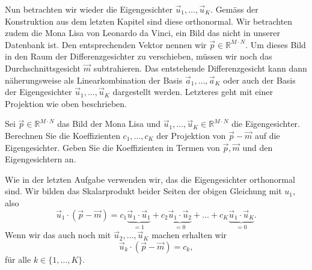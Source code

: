 Nun betrachten wir wieder die Eigengesichter $\vec u_1,\ldots,\vec u_K$.
Gemäss der Konstruktion aus dem letzten Kapitel sind diese orthonormal.
Wir betrachten zudem die Mona Lisa von Leonardo da Vinci, ein Bild das nicht in unserer Datenbank ist.
Den entsprechenden Vektor nennen wir $\vec p\in\mathbb R^{M\cdot N}$.
Um dieses Bild in den Raum der Differenzgesichter zu verschieben, müssen wir noch das Durchschnittsgesicht $\vec m$ subtrahieren.
Das entstehende Differenzgesicht kann dann näherungsweise als Linearkombination der Basis $\vec a_1,\ldots,\vec a_K$ oder auch der Basis der Eigengesichter $\vec u_1,\ldots,\vec u_K$ dargestellt werden.
Letzteres geht mit einer Projektion wie oben beschrieben.
\begin{aufgabe} \label{aufg:projection}
	Sei $\vec p\in\mathbb R^{M\cdot N}$ das Bild der Mona Lisa und $\vec u_1,\ldots,\vec u_K\in\mathbb R^{M\cdot N}$ die Eigengesichter.
	Berechnen Sie die Koeffizienten $c_1,\ldots,c_K$ der Projektion von $\vec p-\vec m$ auf die Eigengesichter.
	Geben Sie die Koeffizienten in Termen von $\vec p, \vec m$ und den Eigengesichtern an.
\end{aufgabe}
\begin{losung*}
	Wie in der letzten Aufgabe verwenden wir, das die Eigengesichter orthonormal sind.
	Wir bilden das Skalarprodukt beider Seiten der obigen Gleichung mit $u_1$, also
	\begin{equation*}
		\vec u_1\cdot\left(\vec p-\vec m\right)=c_1\underbrace{\vec u_1\cdot\vec u_1}_{=1}+c_2\underbrace{\vec u_1\cdot\vec u_2}_{=0}+\ldots+c_K\underbrace{\vec u_1\cdot\vec u_K}_{=0}.
	\end{equation*}
	Wenn wir das auch noch mit $\vec u_2,\ldots,\vec u_K$ machen erhalten wir
	\begin{equation*}
		\vec u_k\cdot\left(\vec p-\vec m\right)=c_k,
	\end{equation*}
	für alle $k\in\{1,\ldots,K\}$.
\end{losung*}

